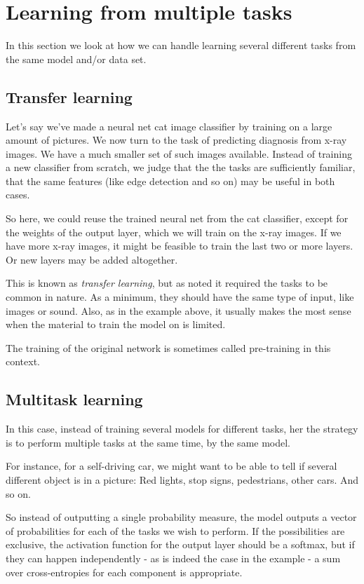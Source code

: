 \documentclass[12pt, a4paper]{article}
\numberwithin{equation}{section}
\begin{document}
\section{Learning from multiple tasks}
In this section we look at how we can handle learning several different tasks from the same model and/or data set.

\subsection{Transfer learning}
Let's say we've made a neural net cat image classifier by training on a large amount of pictures. We now turn to the task of predicting diagnosis from x-ray images. We have a much smaller set of such images available. Instead of training a new classifier from scratch, we judge that the the tasks are sufficiently familiar, that the same features (like edge detection and so on) may be useful in both cases.

So here, we could reuse the trained neural net from the cat classifier, except for the weights of the output layer, which we will train on the x-ray images. If we have more x-ray images, it might be feasible to train the last two or more layers. Or new layers may be added altogether.

This is known as \textit{transfer learning}, but as noted it required the tasks to be common in nature. As a minimum, they should have the same type of input, like images or sound. Also, as in the example above, it usually makes the most sense when the material to train the model on is limited.

The training of the original network is sometimes called pre-training in this context.

\subsection{Multitask learning}
In this case, instead of training several models for different tasks, her the strategy is to perform multiple tasks at the same time, by the same model.

For instance, for a self-driving car, we might want to be able to tell if several different object is in a picture: Red lights, stop signs, pedestrians, other cars. And so on.

So instead of outputting a single probability measure, the model outputs a vector of probabilities for each of the tasks we wish to perform. If the possibilities are exclusive, the activation function for the output layer should be a softmax, but if they can happen independently - as is indeed the case in the example - a sum over cross-entropies for each component is appropriate.
\end{document}
